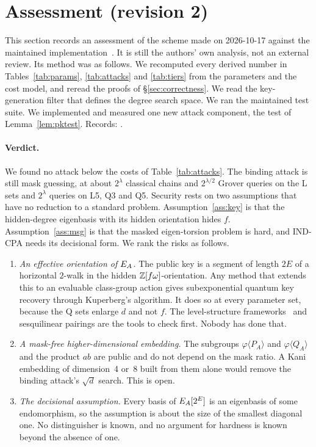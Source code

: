\section{Assessment (revision 2)}\label{sec:assessment}

This section records an assessment of the scheme made on 2026-10-17 against
the maintained implementation~\cite{EigenX}. It is still the authors' own
analysis, not an external review. Its method was as follows. We recomputed
every derived number in Tables~\ref{tab:params}, \ref{tab:attacks} and
\ref{tab:tiers} from the parameters and the cost model, and reread the
proofs of \S\ref{sec:correctness}. We read the key-generation filter that
defines the degree search space. We ran the maintained test suite. We
implemented and measured one new attack component, the test of
Lemma~\ref{lem:pktest}. Records:
.

\paragraph{Verdict.} We found no attack below the costs of
Table~\ref{tab:attacks}. The binding attack is still mask guessing, at about
$2^\lambda$ classical chains and $2^{\lambda/2}$ Grover queries on the L sets
and $2^\lambda$ queries on L5, Q3 and Q5. Security rests on two assumptions
that have no reduction to a standard problem. Assumption~\ref{ass:key} is that
the hidden-degree eigenbasis with its hidden orientation hides $f$.
Assumption~\ref{ass:msg} is that the masked eigen-torsion problem is hard, and
IND-CPA needs its decisional form. We rank the risks as follows.
\begin{enumerate}
\item \emph{An effective orientation of $E_A$.} The public key is a segment
  of length $2E$ of a horizontal $2$-walk in the hidden
  $\mathbb{Z}[f\omega]$-orientation. Any method that extends this to an evaluable
  class-group action gives subexponential quantum key recovery through
  Kuperberg's algorithm. It does so at every parameter set, because the Q sets
  enlarge $d$ and not $f$. The level-structure
  frameworks~\cite{DFP24,Arpin24} and sesquilinear pairings are the tools to
  check first. Nobody has done that.
\item \emph{A mask-free higher-dimensional embedding.} The subgroups
  $\varphi\langle P_A\rangle$ and $\varphi\langle Q_A\rangle$ and the product
  $ab$ are public and do not depend on the mask ratio. A Kani embedding of
  dimension~4 or~8 built from them alone would remove the binding attack's
  $\sqrt d$ search. This is open.
\item \emph{The decisional assumption.} Every basis of $E_A[2^E]$ is an
  eigenbasis of some endomorphism, so the assumption is about the size of the
  smallest diagonal one. No distinguisher is known, and no argument for
  hardness is known beyond the absence of one.
\end{enumerate}

